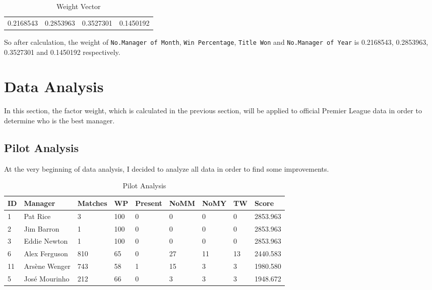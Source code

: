 \documentclass[12pt,a4paper]{article}
\begin{document}
\begin{table}[h]
    \centering
    \caption{Weight Vector}
    \label{my-label}
    \begin{tabular}{llll}
    0.2168543 & 0.2853963 & 0.3527301 & 0.1450192
    \end{tabular}
\end{table}

    So after calculation, the weight of \texttt{No.Manager of Month}, \texttt{Win Percentage}, \texttt{Title Won} and \texttt{No.Manager of Year} is 0.2168543, 0.2853963, 0.3527301 and 0.1450192 respectively.
	
\section{Data Analysis}

    In this section, the factor weight, which is calculated in the previous section, will be applied to official Premier League data in order to determine who is the best manager.


\subsection{Pilot Analysis}
    

    
    At the very beginning of data analysis, I decided to analyze all data in order to find some improvements.



\begin{table}[h]
    \centering
    \caption{Pilot Analysis}
    \begin{tabular}{lllllllll}
    \hline
    ID & Manager & Matches & WP & Present & NoMM & NoMY & TW & Score  \\
    \hline\hline
    1 & Pat Rice & 3 & 100  & 0 & 0 & 0 & 0 & 2853.963 \\
    2 & Jim Barron & 1 & 100 & 0 & 0 & 0 & 0 & 2853.963  \\
    3 & Eddie Newton & 1 & 100 & 0 & 0 & 0 & 0 & 2853.963  \\
    6 & Alex Ferguson & 810 & 65 & 0 & 27 & 11 & 13 & 2440.583  \\
    11 & Arsène Wenger & 743 & 58 & 1 & 15 & 3 & 3 & 1980.580  \\
    5 & José Mourinho & 212 & 66 & 0 & 3 & 3 & 3 & 1948.672  \\
     \hline\hline
    \end{tabular}
\end{table}
\end{document}
